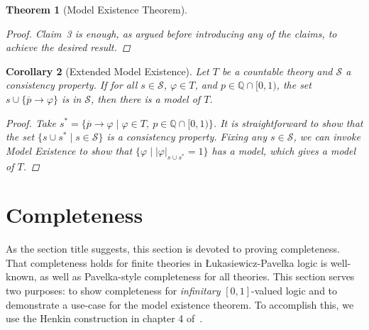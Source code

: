\documentclass{amsart}
\newtheorem{theorem}{Theorem}[section]
\newtheorem{corollary}[theorem]{Corollary}
\theoremstyle{definition}
\numberwithin{equation}{theorem}
\renewcommand{\phi}{\varphi}
\newcommand{\Q}{\mathbb{Q}}
\newcommand{\where}{\mid}
\newcommand{\rat}[1]{{\overline{#1}}}
\newcommand{\narrow}[1]{\xrightarrow{#1}}
\renewcommand{\to}{\narrow{}}
\newcommand{\luk}{{\L}ukasiewicz}
\begin{document}
\begin{theorem}[Model Existence Theorem]
\begin{proof}
    Claim~3 is enough, as argued before introducing any of the claims, to achieve the desired result.
  \end{proof}
\end{theorem}

\begin{corollary}[Extended Model Existence]\label{thm:model-existence-ex}
  Let $T$ be a countable theory and $\mathscr{S}$ a consistency property.
  If for all $s\in \mathscr{S}$, $\phi\in T$, and $p\in\Q\cap[0,1)$, the set $s\cup\{\rat p\to \phi\}$ is in $\mathscr{S}$, then there is a model of $T$.
  \begin{proof}
    Take $s^*=\{\rat p\to\phi\where\phi\in T,\ p\in\Q\cap[0,1)\}$.
    It is straightforward to show that the set $\{s\cup s^*\where s\in \mathscr{S}\}$ is a consistency property.
    Fixing any $s\in \mathscr{S}$, we can invoke Model Existence to show that $\{\phi\where |\phi|_{s\cup s^*}=1\}$ has a model, which gives a model of $T$.
  \end{proof}
\end{corollary}

\section{Completeness}
As the section title suggests, this section is devoted to proving completeness.
That completeness holds for finite theories in {\luk}-Pavelka logic is well-known, as well as Pavelka-style completeness for all theories.
This section serves two purposes: to show completeness for \emph{infinitary} $[0,1]$-valued logic and to demonstrate a use-case for the model existence theorem.
To accomplish this, we use the Henkin construction in chapter 4 of~\cite{keisler1971model}.
\end{document}
